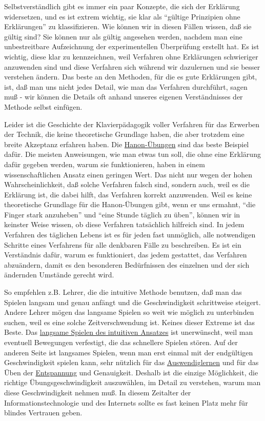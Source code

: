Selbstverständlich gibt es immer ein paar Konzepte, die sich der Erklärung widersetzen, und es ist extrem wichtig, sie klar als \enquote{gültige Prinzipien ohne Erklärungen} zu klassifizieren.
Wie können wir in diesen Fällen wissen, daß sie gültig sind?
Sie können nur als gültig angesehen werden, nachdem man eine unbestreitbare Aufzeichnung der experimentellen Überprüfung erstellt hat.
Es ist wichtig, diese klar zu kennzeichnen, weil Verfahren ohne Erklärungen schwieriger anzuwenden sind und diese Verfahren sich während wir dazulernen und sie besser verstehen ändern.
Das beste an den Methoden, für die es gute Erklärungen gibt, ist, daß man uns nicht jedes Detail, wie man das Verfahren durchführt, sagen muß - wir können die Details oft anhand unseres eigenen Verständnisses der Methode selbst einfügen.

Leider ist die Geschichte der Klavierpädagogik voller Verfahren für das Erwerben der Technik, die keine theoretische Grundlage haben, die aber trotzdem eine breite Akzeptanz erfahren haben.
Die \hyperref[c1iii7h]{Hanon-Übungen} sind das beste Beispiel dafür.
Die meisten Anweisungen, wie man etwas tun soll, die ohne eine Erklärung dafür gegeben werden, warum sie funktionieren, haben in einem wissenschaftlichen Ansatz einen geringen Wert.
Das nicht nur wegen der hohen Wahrscheinlichkeit, daß solche Verfahren falsch sind, sondern auch, weil es die Erklärung ist, die dabei hilft, das Verfahren korrekt anzuwenden.
Weil es keine theoretische Grundlage für die Hanon-Übungen gibt, wenn er uns ermahnt, \enquote{die Finger stark anzuheben} und \enquote{eine Stunde täglich zu üben}, können wir in keinster Weise wissen, ob diese Verfahren tatsächlich hilfreich sind.
In jedem Verfahren des täglichen Lebens ist es für jeden fast unmöglich, alle notwendigen Schritte eines Verfahrens für alle denkbaren Fälle zu beschreiben.
Es ist ein Verständnis dafür, warum es funktioniert, das jedem gestattet, das Verfahren abzuändern, damit es den besonderen Bedürfnissen des einzelnen und der sich ändernden Umstände gerecht wird.

So empfehlen z.B. Lehrer, die die intuitive Methode benutzen, daß man das Spielen langsam und genau anfängt und die Geschwindigkeit schrittweise steigert.
Andere Lehrer mögen das langsame Spielen so weit wie möglich zu unterbinden suchen, weil es eine solche Zeitverschwendung ist.
Keines dieser Extreme ist das Beste.
Das \hyperref[c1ii16]{langsame Spielen des intuitiven Ansatzes} ist unerwünscht, weil man eventuell Bewegungen verfestigt, die das schnellere Spielen stören.
Auf der anderen Seite ist langsames Spielen, wenn man erst einmal mit der endgültigen Geschwindigkeit spielen kann, sehr nützlich für das \hyperref[c1iii6h]{Auswendiglernen} und für das Üben der \hyperref[c1ii14]{Entspannung} und Genauigkeit.
Deshalb ist die einzige Möglichkeit, die richtige Übungsgeschwindigkeit auszuwählen, im Detail zu verstehen, warum man diese Geschwindigkeit nehmen muß.
In diesem Zeitalter der Informationstechnologie und des Internets sollte es fast keinen Platz mehr für blindes Vertrauen geben.

